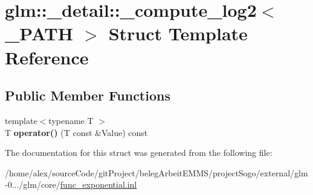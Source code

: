 \hypertarget{structglm_1_1__detail_1_1__compute__log2}{\section{glm\-:\-:\-\_\-detail\-:\-:\-\_\-compute\-\_\-log2$<$ \-\_\-\-P\-A\-T\-H $>$ Struct Template Reference}
\label{structglm_1_1__detail_1_1__compute__log2}
}
\subsection*{Public Member Functions}
\begin{DoxyCompactItemize}
\item 
\hypertarget{structglm_1_1__detail_1_1__compute__log2_aca7f23dcf7f951497006e6b6de4a77a4}{{\footnotesize template$<$typename T $>$ }\\T {\bfseries operator()} (T const \&Value) const }\label{structglm_1_1__detail_1_1__compute__log2_aca7f23dcf7f951497006e6b6de4a77a4}

\end{DoxyCompactItemize}


The documentation for this struct was generated from the following file\-:\begin{DoxyCompactItemize}
\item 
/home/alex/source\-Code/git\-Project/beleg\-Arbeit\-E\-M\-M\-S/project\-Sogo/external/glm-\/0.../glm/core/\hyperlink{func__exponential_8inl}{func\-\_\-exponential.\-inl}\end{DoxyCompactItemize}
